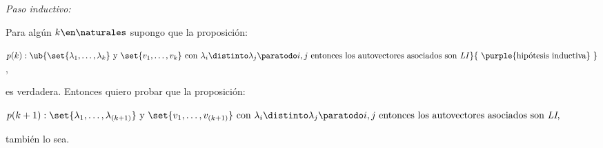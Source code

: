 \begin{enumerate}[label=\alph*)]
        \bigskip

        \textit{Paso inductivo:}

        Para algún $k \en \naturales$ supongo que la proposición:
        \begin{center}
          $p(k):
            \ub{
              \set{\lambda_1, \ldots, \lambda_k}
              \text{ y }
              \set{v_1, \ldots, v_k}
              \text{ con } \lambda_i \distinto \lambda_j \paratodo i, j
              \text{ entonces los autovectores asociados son \textit{LI}}
            }{
              \text{
                \purple{hipótesis inductiva}
              }
            }
          $,
        \end{center}
        es verdadera. Entonces quiero probar que la proposición:
        \begin{center}
          $
            p(k + 1):
            \set{\lambda_1, \ldots, \lambda_{(k+1)}}
            \text{ y }
            \set{v_1, \ldots, v_{(k+1)}}
            \text{ con } \lambda_i \distinto \lambda_j \paratodo i, j
            \text{ entonces los autovectores asociados son \textit{LI},}
          $
        \end{center}
        también lo sea.


\end{enumerate}
